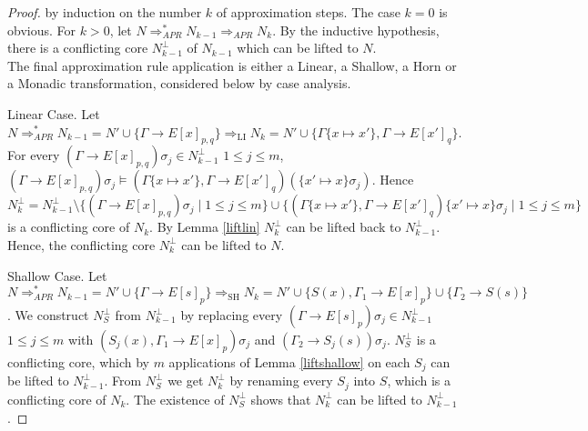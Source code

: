 \documentclass{llncs}
\newcommand{\imp}{\rightarrow}
\newcommand{\apr}{ \Rightarrow_{APR}}
\begin{document}
\begin{proof}
by induction on the number $k$ of approximation steps. The case $k=0$ is obvious.
For $k>0$, let $N\apr^* N_{k-1} \apr N_k$.
By the inductive hypothesis, there is a conflicting core  $N^\bot_{k-1}$ of $N_{k-1}$ which can 
be lifted to $N$.\\
The final approximation rule application is either a Linear, a Shallow, a Horn or a Monadic transformation,
considered below by case analysis.

Linear Case. Let $N\apr^* N_{k-1}= N'\cup\{\Gamma \imp E[x]_{p,q}\} \Rightarrow_{\text{LI}} N_k= N'\cup\{\Gamma\{x \mapsto x'\},\Gamma \imp E[x']_q\}$.
For every $(\Gamma \imp E[x]_{p,q})\sigma_j \in N^\bot_{k-1}$ $1\leq j\leq m$, $(\Gamma \imp E[x]_{p,q})\sigma_j \models (\Gamma\{x \mapsto x'\},\Gamma \imp E[x']_q)(\{x' \mapsto x\}\sigma_j)$. 
Hence $N^\bot_k=N^\bot_{k-1}\setminus\{(\Gamma \imp E[x]_{p,q})\sigma_j\mid 1\leq j\leq m\}\cup \{(\Gamma\{x \mapsto x'\},\Gamma \imp E[x']_q)\{x' \mapsto x\}\sigma_j \mid 1\leq j\leq m\}$ 
is a conflicting core of $N_k$.
By Lemma \ref{liftlin} $N^\bot_k$ can be lifted back to $N^\bot_{k-1}$.
Hence, the conflicting core $N^\bot_k$ can be lifted to $N$.

Shallow Case. Let $N\apr^*  N_{k-1}=N'\cup\{\Gamma \imp E[s]_{p}\} \Rightarrow_{\text{SH}} N_{k}= N'\cup\{S(x),\Gamma_1 \imp E[x]_{p}\}\cup\{ \Gamma_2 \imp S(s)\}$.
We construct $N^\bot_S$ from $N^\bot_{k-1}$ by replacing every $(\Gamma \imp E[s]_{p})\sigma_j \in N^\bot_{k-1}$ $1 \leq j \leq m$ with $(S_j(x),\Gamma_1 \imp E[x]_p)\sigma_j$ and $(\Gamma_2 \imp S_j(s))\sigma_j$.
$N^\bot_S$ is a conflicting core, which by $m$ applications of Lemma \ref{liftshallow} on each $S_j$ can be lifted to $N^\bot_{k-1}$.
From $N^\bot_S$ we get $N^\bot_{k}$ by renaming every $S_j$ into $S$, which is a conflicting core of $N_k$.
The existence of  $N^\bot_S$ shows that $N^\bot_{k}$ can be lifted to $N^\bot_{k-1}$.


\end{proof}
\end{document}
